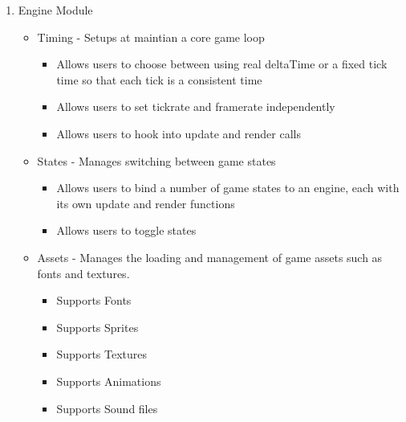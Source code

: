 \documentclass{scrreprt}
\begin{document}
\begin{enumerate}
\item Engine Module
\begin{itemize}
	\item Timing - Setups at maintian a core game loop
	\begin{itemize}
		\item Allows users to choose between using real deltaTime or a fixed tick time so that each tick is a consistent time
		\item Allows users to set tickrate and framerate independently
		\item Allows users to hook into update and render calls
	\end{itemize}
	\item States - Manages switching between game states
	\begin{itemize}
		\item Allows users to bind a number of game states to an engine, each with its own update and render functions
		\item Allows users to toggle states
	\end{itemize}
	\item Assets - Manages the loading and management of game assets such as fonts and textures.
	\begin{itemize}  
		\item Supports Fonts
		\item Supports Sprites
		\item Supports Textures
		\item Supports Animations
		\item Supports Sound files
	\end{itemize}
\end{itemize}


\end{enumerate}
\end{document}
